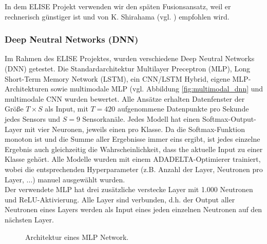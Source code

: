 In dem ELISE Projekt verwenden wir den sp{\"a}ten Fusionsansatz, weil er rechnerisch g{\"u}nstiger ist und von K. Shirahama (vgl. \cite{kimiaki_codebook_approach_2016}) empfohlen wird. \\













\subsubsection{Deep Neutral Networks (DNN)} \label{dnn-1}
Im Rahmen des ELISE Projektes, wurden verschiedene Deep Neutral Networks (DNN) getestet\cite{bscschnieber18}.
Die Standardarchitektur Multilayer Preceptron (MLP), Long Short-Term Memory Network (LSTM), ein CNN/LSTM Hybrid, eigene MLP-Architekturen sowie multimodale MLP (vgl. Abbildung \ref{fig:multimodal_dnn} und multimodale CNN wurden bewertet.
Alle Ansätze erhalten Datenfenster der Größe $T \times S$ als Input, mit $T = 420$ aufgenommene Datenpunkte pro Sekunde jedes Sensors und $S = 9$ Sensorkanäle. 
Jedes Modell hat einen Softmax-Output-Layer mit vier Neuronen, jeweils einen pro Klasse.
Da die Softmax-Funktion monoton ist und die Summe aller Ergebnisse immer eins ergibt, ist jedes einzelne Ergebnis auch gleichzeitig die Wahrscheinlichkeit, dass the aktuelle Input zu einer Klasse gehört.
Alle Modelle wurden mit einem ADADELTA-Optimierer\cite{zeiler12} trainiert, wobei die entsprechenden Hyperparameter (z.B. Anzahl der Layer, Neutronen pro Layer, ...) manuel ausgewählt wurden. \\

Der verwendete MLP hat drei zusätzliche verstecke Layer mit 1.000 Neutronen und ReLU-Aktivierung\cite{nair12}.
Alle Layer sind verbunden, d.h. der Output aller Neutronen eines Layers werden als Input eines jeden einzelnen Neutronen auf den nächsten Layer. \\



\begin{figure}[H]
\caption{Architektur eines MLP Network. }
\label{fig:mlp} \end{figure} \vspace{0.5cm}



